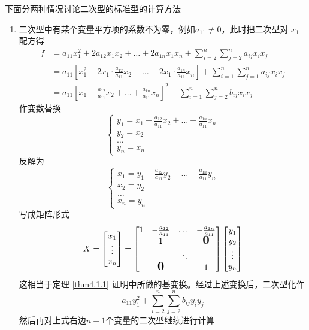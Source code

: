 \documentclass[11pt]{article}
\begin{document}
下面分两种情况讨论二次型的标准型的计算方法
\begin{enumerate}
\item 二次型中有某个变量平方项的系数不为零，例如\(a_{11}\neq0\)，此时把二次型对
\(x_1\)配方得
\begin{align*}
f&=a_{11}x_1^2+2a_{12}x_1x_2+\dots+2a_{1n}x_1x_n+\sum_{i=2}^n\sum_{j=2}^n
a_{ij}x_ix_j\\
&=a_11\left[x_1^2+2x_1\cdot\frac{a_{12}}{a_{11}}x_2+\dots+
2x_1\cdot \frac{a_{1n}}{a_{11}}x_n
\right]+\sum_{i=1}^n\sum_{j=1}^na_{ij}x_ix_j\\
&=a_{11}\left[
x_1+\frac{a_{12}}{a_{11}}x_2+\dots+\frac{a_{1n}}{a_{11}}x_n
\right]^2+\sum_{i=1}^n\sum_{j=2}^nb_{ij}x_ix_j
\end{align*}
作变数替换
\begin{equation*}
\begin{cases}
y_1=x_1+\frac{a_{12}}{a_{11}}x_2+\dots+\frac{a_{1n}}{a_{11}}x_n\\
y_2=x_2\\
\dots\\
y_n=x_n
\end{cases}
\end{equation*}
反解为
\begin{equation*}
\begin{cases}
x_1=y_1-\frac{a_{12}}{a_{11}}y_2-\dots-\frac{a_{1n}}{a_{11}}y_n\\
x_2=y_2\\
\dots\\
x_n=y_n
\end{cases}
\end{equation*}
写成矩阵形式
\begin{equation*}
X=
\begin{bmatrix}
x_1\\\vdots\\x_n
\end{bmatrix}=
\begin{bmatrix}
1&-\frac{a_{12}}{a_{11}}&\dots&-\frac{a_{1n}}{a_{11}}\\
&1&&\mbox{\normalfont\Large\bfseries 0}\\
&&\ddots&\\
&\mbox{\normalfont\Large\bfseries 0}&&1
\end{bmatrix}
\begin{bmatrix}
y_1\\y_2\\\vdots\\y_n
\end{bmatrix}
\end{equation*}
这相当于定理 \ref{thm4.1.1} 证明中所做的基变换。经过上述变换后，二次型化作
\begin{equation*}
a_{11}y_1^2+\sum_{i=2}^n\sum_{j=2}^nb_{ij}y_iy_j
\end{equation*}
然后再对上式右边\(n-1\)个变量的二次型继续进行计算


\end{enumerate}
\end{document}
